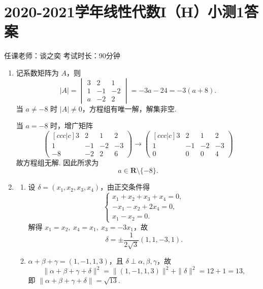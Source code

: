 \section{2020-2021学年线性代数I（H）小测1答案}

\begin{center}
    任课老师：谈之奕\hspace{4em} 考试时长：90分钟
\end{center}
\begin{enumerate}
    \item 记系数矩阵为 $A$，则
    \[
        |A|=\begin{vmatrix}
            3&2&1\\
            1&-1&-2\\
            a&-2&2
        \end{vmatrix}=-3a-24=-3(a+8).
    \]
    当 $a\neq -8$ 时 $|A|\neq 0$，方程组有唯一解，解集非空.

    当 $a=-8$ 时，增广矩阵
    \[
        \begin{pmatrix}[ccc|c]
            3&2&1&2\\
            1&-1&-2&-3\\
            -8&-2&2&6
        \end{pmatrix} \to
        \begin{pmatrix}[ccc|c]
            3&2&1&2\\
            1&-1&-2&-3\\
            0&0&0&4
        \end{pmatrix}
    \]
    故方程组无解. 因此所求为
    \[
        a\in\mathbf{R}\setminus\{-8\}.
    \]

    \item
    \begin{enumerate}
        \item 设 $\delta=(x_1,x_2,x_3,x_4)$，由正交条件得
        \[
            \begin{cases}
                x_1+x_2+x_3+x_4=0,\\
                -x_1-x_2+2x_4=0,\\
                x_1-x_2=0.
            \end{cases}
        \]
        解得 $x_1=x_2,\ x_4=x_1,\ x_3=-3x_1$，故
        \[
            \delta=\pm\frac{1}{2\sqrt{3}}(1,1,-3,1).
        \]

        \item $\alpha+\beta+\gamma=(1,-1,1,3)$，且 $\delta\perp\alpha,\beta,\gamma$，故
        \[
            \|\alpha+\beta+\gamma+\delta\|^2=\|(1,-1,1,3)\|^2+\|\delta\|^2=12+1=13,
        \]
        即 $\|\alpha+\beta+\gamma+\delta\|=\sqrt{13}$.
    \end{enumerate}


\end{enumerate}
